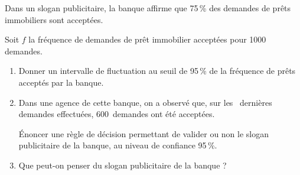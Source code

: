 
 Dans un slogan publicitaire, la banque affirme que 75\,\% des demandes de prêts immobiliers sont acceptées.
 
Soit $f$ la fréquence de demandes de prêt immobilier acceptées pour 1000 demandes. 
	\begin{enumerate}
		\item Donner un intervalle de fluctuation au seuil de 95\,\% de la fréquence de prêts acceptés par la banque. 
		\item Dans une agence de cette banque, on a observé que, sur les ~dernières demandes effectuées, $600$~demandes ont été acceptées.
		 
Énoncer une règle de décision permettant de valider ou non le slogan publicitaire de la banque, au niveau de confiance 95\,\%. 
		\item Que peut-on penser du slogan publicitaire de la banque ? 
	\end{enumerate}
